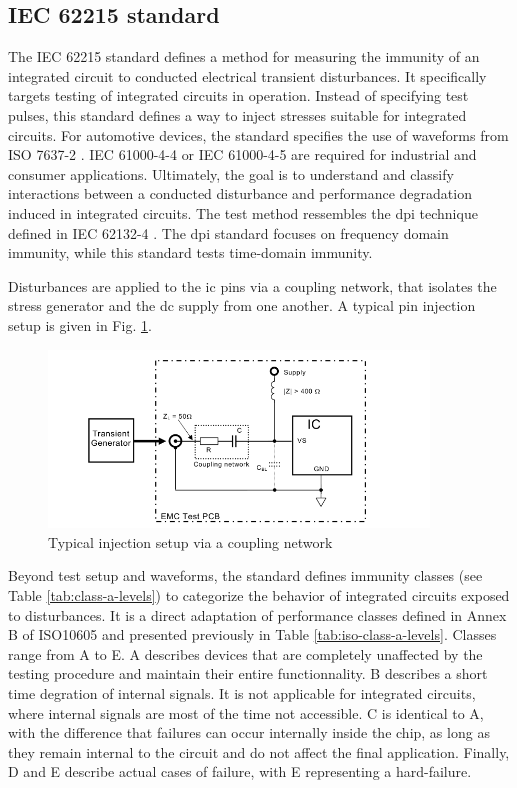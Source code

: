 \subsection{IEC 62215 standard}

The IEC 62215 standard \cite{iec62215} defines a method for measuring the immunity of an integrated circuit to conducted electrical transient disturbances.
It specifically targets testing of integrated circuits in operation.
Instead of specifying test pulses, this standard defines a way to inject stresses suitable for integrated circuits.
For automotive devices, the standard specifies the use of waveforms from ISO 7637-2 \cite{iso7637-2}.
IEC 61000-4-4 \cite{iec61000-4-4} or IEC 61000-4-5 are required for industrial and consumer applications.
Ultimately, the goal is to understand and classify interactions between a conducted disturbance and performance degradation induced in integrated circuits.
The test method ressembles the \gls{dpi} technique defined in IEC 62132-4 \cite{iec62132-4}.
The \gls{dpi} standard focuses on frequency domain immunity, while this standard tests time-domain immunity.

Disturbances are applied to the \gls{ic} pins via a coupling network, that isolates the stress generator and the \gls{dc} supply from one another.
A typical pin injection setup is given in Fig. \ref{fig:iec62215_setup}.

\begin{figure}[!h]
  \centering
  \includegraphics[width=0.9\textwidth]{src/1/figures/iec62215_setup.png}
  \caption{Typical injection setup via a coupling network}
  \label{fig:iec62215_setup}
\end{figure}

Beyond test setup and waveforms, the standard defines immunity classes (see Table \ref{tab:class-a-levels}) to categorize the behavior of integrated circuits exposed to disturbances.
It is a direct adaptation of performance classes defined in Annex B of ISO10605 and presented previously in Table \ref{tab:iso-class-a-levels}.
Classes range from A to E.
A describes devices that are completely unaffected by the testing procedure and maintain their entire functionnality.
B describes a short time degration of internal signals. It is not applicable for integrated circuits, where internal signals are most of the time not accessible.
C is identical to A, with the difference that failures can occur internally inside the chip, as long as they remain internal to the circuit and do not affect the final application.
Finally, D and E describe actual cases of failure, with E representing a hard-failure.

